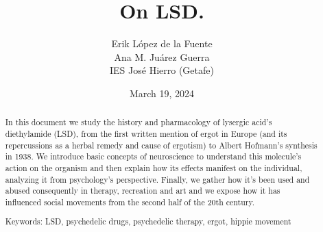 \documentclass[a4paper, titlepage]{article}
\title{On LSD.}
\author{Erik López de la Fuente \\ Ana M. Juárez Guerra \\ IES José Hierro (Getafe)}
\date{March 19, 2024}
\begin{document}
\maketitle

\begin{abstract}
In this document we study the history and pharmacology of lysergic acid's diethylamide (LSD), from the first written mention of ergot in Europe (and its repercussions as a herbal remedy and cause of ergotism) to Albert Hofmann's synthesis in 1938. We introduce basic concepts of neuroscience to understand this molecule's action on the organism and then explain how its effects manifest on the individual, analyzing it from psychology's perspective. Finally, we gather how it's been used and abused consequently in therapy, recreation and art and we expose how it has influenced social movements from the second half of the 20th century.

Keywords: LSD, psychedelic drugs, psychedelic therapy, ergot, hippie movement
\end{abstract}



\tableofcontents

\newpage









\nocite{*}


\end{document}
